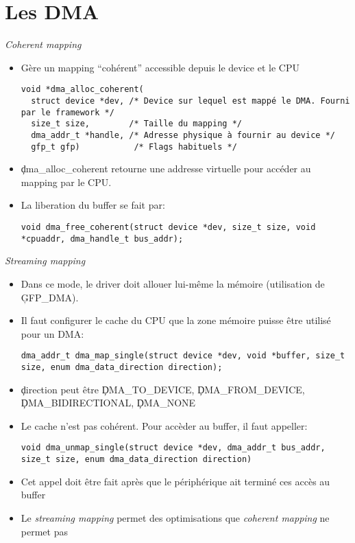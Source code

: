 \section{Les DMA}
 
\begin{frame}[fragile=singleslide]{\emph{Coherent mapping}}
  \begin{itemize}
  \item Gère un mapping ``cohérent'' accessible depuis le device et le
    CPU
    \begin{lstlisting} 
void *dma_alloc_coherent(
  struct device *dev, /* Device sur lequel est mappé le DMA. Fourni par le framework */
  size_t size,        /* Taille du mapping */
  dma_addr_t *handle, /* Adresse physique à fournir au device */
  gfp_t gfp)           /* Flags habituels */
    \end{lstlisting} 
  \item  \c{dma_alloc_coherent} retourne  une addresse  virtuelle pour
    accéder au mapping par le CPU.
  \item La liberation du buffer se fait par:
    \begin{lstlisting} 
void dma_free_coherent(struct device *dev, size_t size, void *cpuaddr, dma_handle_t bus_addr);
    \end{lstlisting} 
  \end{itemize} 
\end{frame} 

\begin{frame}[fragile=singleslide]{\emph{Streaming mapping}}
  \begin{itemize} 
  \item  Dans ce  mode, le  driver  doit allouer  lui-même la  mémoire
    (utilisation de \c{GFP_DMA}).
  \item Il faut configurer le cache  du CPU que la zone mémoire puisse
    être utilisé pour un DMA:
    \begin{lstlisting} 
dma_addr_t dma_map_single(struct device *dev, void *buffer, size_t size, enum dma_data_direction direction);
    \end{lstlisting} 
  \item \c{direction} peut être \c{DMA_TO_DEVICE},
    \c{DMA_FROM_DEVICE}, \c{DMA_BIDIRECTIONAL}, \c{DMA_NONE}
  \item Le cache  n'est pas cohérent. Pour accèder  au buffer, il faut
    appeller:
    \begin{lstlisting} 
void dma_unmap_single(struct device *dev, dma_addr_t bus_addr, size_t size, enum dma_data_direction direction)
    \end{lstlisting} 
  \item Cet appel doit être fait après que le périphérique ait terminé
    ces accès au buffer
  \item  Le  \emph{streaming  mapping}  permet des  optimisations  que
    \emph{coherent mapping} ne permet pas
  \end{itemize}
\end{frame} 

